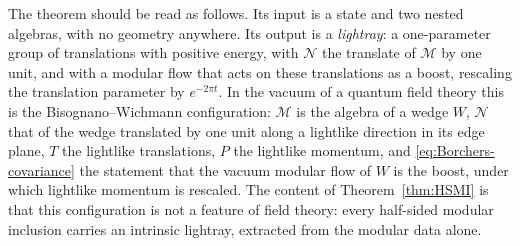 \documentclass[a4paper,11pt]{article}
\theoremstyle{definition}
\newcommand{\mN}{\mathcal{N}}
\newcommand{\mM}{\mathcal{M}}
\begin{document}
The theorem should be read as follows. Its input is a state and two nested algebras, with no geometry anywhere. Its output is a \emph{lightray}: a one-parameter group of translations with positive energy, with $\mN$ the translate of $\mM$ by one unit, and with a modular flow that acts on these translations as a boost, rescaling the translation parameter by $e^{-2\pi t}$. In the vacuum of a quantum field theory this is the Bisognano--Wichmann configuration: $\mM$ is the algebra of a wedge $W$, $\mN$ that of the wedge translated by one unit along a lightlike direction in its edge plane, $T$ the lightlike translations, $P$ the lightlike momentum, and \eqref{eq:Borchers-covariance} the statement that the vacuum modular flow of $W$ is the boost, under which lightlike momentum is rescaled. The content of Theorem~\ref{thm:HSMI} is that this configuration is not a feature of field theory: every half-sided modular inclusion carries an intrinsic lightray, extracted from the modular data alone.
\end{document}
